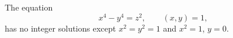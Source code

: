 \begin{proposition}
    The equation
\[
    x^4-y^4=z^2,\qquad (x,y)=1,
\]
    has no integer solutions except $x^2=y^2=1$ and $x^2=1$, $y=0$.
\end{proposition}
